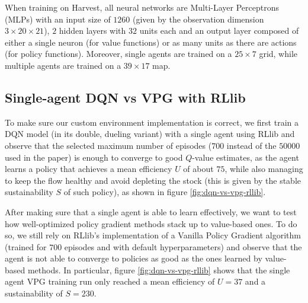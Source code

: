 \documentclass{article}
\begin{document}
When training on Harvest, all neural networks are Multi-Layer Perceptrons (MLPs) with an input size of $1260$ (given by the observation dimension $3\times20\times21$), $2$ hidden layers with $32$ units each and an output layer composed of either a single neuron (for value functions) or as many units as there are actions (for policy functions). Moreover, single agents are trained on a $25\times7$ grid, while multiple agents are trained on a $39\times17$ map.

\subsection{Single-agent DQN vs VPG with RLlib}
To make sure our custom environment implementation is correct, we first train a DQN model (in its double, dueling variant) with a single agent using RLlib and observe that the selected maximum number of episodes ($700$ instead of the $50000$ used in the paper) is enough to converge to good $Q$-value estimates, as the agent learns a policy that achieves a mean efficiency $U$ of about $75$, while also managing to keep the flow healthy and avoid depleting the stock (this is given by the stable sustainability $S$ of such policy), as shown in figure \ref{fig:dqn-vs-vpg-rllib}.

After making sure that a single agent is able to learn effectively, we want to test how well-optimized policy gradient methods stack up to value-based ones. To do so, we still rely on RLlib's implementation of a Vanilla Policy Gradient algorithm (trained for $700$ episodes and with default hyperparameters) and observe that the agent is not able to converge to policies as good as the ones learned by value-based methods. In particular, figure \ref{fig:dqn-vs-vpg-rllib} shows that the single agent VPG training run only reached a mean efficiency of $U=37$ and a sustainability of $S=230$. 
\end{document}
